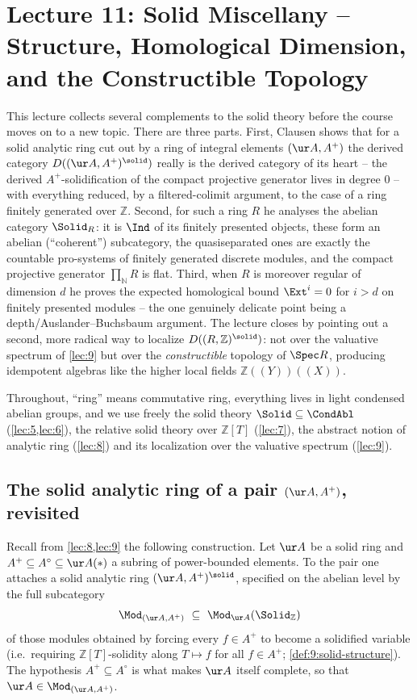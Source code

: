 \section{Lecture 11: Solid Miscellany -- Structure, Homological Dimension, and the Constructible Topology}
\label{lec:11}

This lecture collects several complements to the solid theory before the
course moves on to a new topic. There are three parts. First, Clausen shows
that for a solid analytic ring cut out by a ring of integral elements
$(\ur A,A^{+})$ the derived category $D((\ur A,A^{+})^{\solid})$ really is the
derived category of its heart -- the derived $A^{+}$-solidification of the
compact projective generator lives in degree $0$ -- with everything reduced,
by a filtered-colimit argument, to the case of a ring finitely generated over
$\mathbb{Z}$. Second, for such a ring $R$ he analyses the abelian category
$\Solid_{R}$: it is $\Ind$ of its finitely presented objects, these form an
abelian (``coherent'') subcategory, the quasiseparated ones are exactly the
countable pro-systems of finitely generated discrete modules, and the compact
projective generator $\prod_{\mathbb{N}}R$ is flat. Third, when $R$ is
moreover regular of dimension $d$ he proves the expected homological bound
$\Ext^{i}=0$ for $i>d$ on finitely presented modules -- the one genuinely
delicate point being a depth/Auslander--Buchsbaum argument. The lecture closes
by pointing out a second, more radical way to localize $D((R,\mathbb{Z})^{
\solid})$: not over the valuative spectrum of \cref{lec:9} but over the
\emph{constructible} topology of $\Spec R$, producing idempotent algebras like
the higher local fields $\mathbb{Z}(\!(Y)\!)(\!(X)\!)$.

Throughout, ``ring'' means commutative ring, everything lives in light
condensed abelian groups, and we use freely the solid theory
$\Solid\subseteq\CondAbl$ (\cref{lec:5,lec:6}), the relative solid theory over
$\mathbb{Z}[T]$ (\cref{lec:7}), the abstract notion of analytic ring
(\cref{lec:8}) and its localization over the valuative spectrum (\cref{lec:9}).

\subsection{The solid analytic ring of a pair \texorpdfstring{$(\ur A,A^{+})$}{(A,A+)}, revisited}

Recall from \cref{lec:8,lec:9} the following construction. Let $\ur A$ be a
solid ring and $A^{+}\subseteq A^{\circ}\subseteq\ur A(\ast)$ a subring of
power-bounded elements. To the pair one attaches a solid analytic ring
$(\ur A,A^{+})^{\solid}$, specified on the abelian level by the full
subcategory
\begin{equation}
\label{eq:11:mod-pair}
\Mod_{(\ur A,A^{+})}\ \subseteq\ \Mod_{\ur A}(\Solid_{\mathbb{Z}})
\end{equation}
of those modules obtained by forcing every $f\in A^{+}$ to become a solidified
variable (i.e.\ requiring $\mathbb{Z}[T]$-solidity along $T\mapsto f$ for all
$f\in A^{+}$; \cref{def:9:solid-structure}). The hypothesis $A^{+}\subseteq
A^{\circ}$ is what makes $\ur A$ itself complete, so that $\ur A\in\Mod_{(\ur
A,A^{+})}$.

